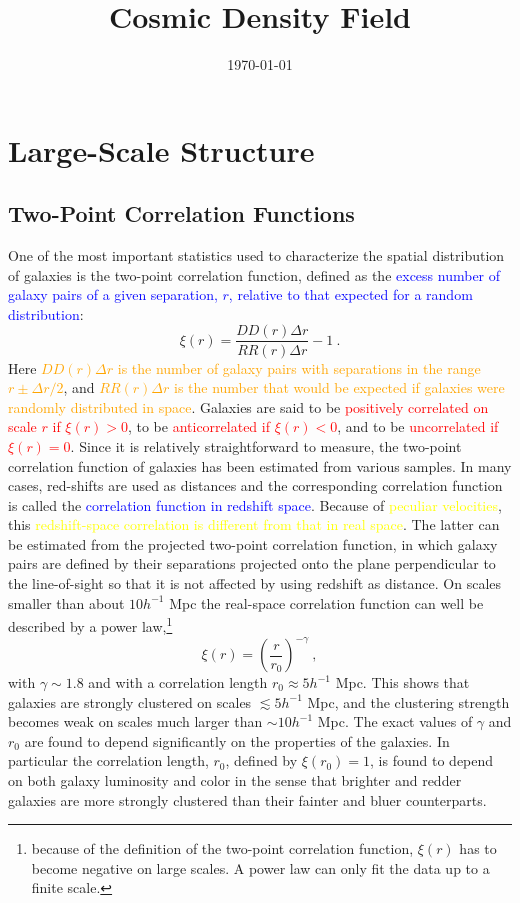 \documentclass[12pt,a4paper]{article}
\title{Cosmic Density Field}
\author{}
\date{\today}
\begin{document}
\maketitle

\section{Large-Scale Structure}

\subsection{Two-Point Correlation Functions}
\cite{2010gfe..book.....M} One of the most important statistics used to characterize the spatial distribution of galaxies is the two-point correlation function, defined as the \textcolor{blue}{excess number of galaxy pairs of a given separation, $r$, relative to that expected for a random distribution}:
\begin{equation}
\xi(r) = \dfrac{DD(r) \Delta r}{RR(r) \Delta r} -1 ~.
\end{equation}
Here \textcolor{orange}{$DD(r) \Delta r$ is the number of galaxy pairs with separations in the range $r \pm \Delta r/2$}, and \textcolor{orange}{$RR(r) \Delta r$ is the number that would be expected if galaxies were randomly distributed in space}. Galaxies are said to be \textcolor{red}{positively correlated on scale $r$ if $\xi(r) > 0$}, to be \textcolor{red}{anticorrelated if $\xi(r) < 0$}, and to be \textcolor{red}{uncorrelated if $\xi(r) = 0$}. Since it is relatively straightforward to measure, the two-point correlation function of galaxies has been estimated from various samples. In many cases, red-shifts are used as distances and the corresponding correlation function is called the \textcolor{blue}{correlation function in redshift space}. Because of \textcolor{yellow}{peculiar velocities}, this \textcolor{yellow}{redshift-space correlation is different from that in real space}. The latter can be estimated from the projected two-point correlation function, in which galaxy pairs are defined by their separations projected onto the plane perpendicular to the line-of-sight so that it is not affected by using redshift as distance. On scales smaller than about $10 h^{-1}$ Mpc the real-space correlation function can well be described by a power law,\footnote{because of the definition of the two-point correlation function, $\xi(r)$ has to become negative on large scales. A power law can only fit the data up to a finite scale.} 
\begin{equation}
\xi(r) = \left( \dfrac{r}{r_0} \right)^{-\gamma} ~,
\end{equation}
with $\gamma \sim 1.8$ and with a correlation length $r_0 \approx 5 h^{-1}$ Mpc. This shows that galaxies are strongly clustered on scales $\lesssim 5 h^{-1}$ Mpc, and the clustering strength becomes weak on scales much larger than $\sim 10 h^{-1}$ Mpc. The exact values of $\gamma$ and $r_0$ are found to depend significantly on the properties of the galaxies. In particular the correlation length, $r_0$, defined by $\xi(r_0) = 1$, is found to depend on both galaxy luminosity and color in the sense that brighter and redder galaxies are more strongly clustered than their fainter and bluer counterparts. 
\end{document}
